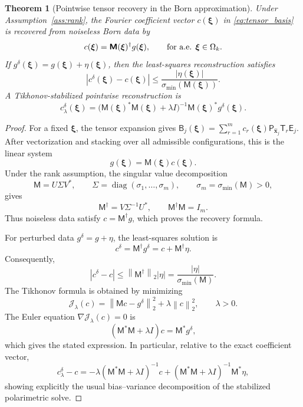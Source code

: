 \documentclass[11pt]{article}
\numberwithin{equation}{section}
\newcommand{\vect}[1]{\bm{#1}}
\newcommand{\tens}[1]{\bm{\mathsf{#1}}}
\newcommand{\Tt}{\ensuremath{\tens{T}}}
\newcommand{\Mt}{\ensuremath{\tens{M}}}
\newcommand{\Bt}{\ensuremath{\tens{B}}}
\newcommand{\abs}[1]{\left\lvert #1\right\rvert}
\newcommand{\norm}[1]{\left\lVert #1\right\rVert}
\theoremstyle{plain}
\newtheorem{theorem}{Theorem}[section]
\theoremstyle{definition}
\begin{document}
\begin{theorem}[Pointwise tensor recovery in the Born approximation]\label{thm:tensor_recovery}
Under Assumption~\ref{ass:rank}, the Fourier coefficient vector $c(\vect{\xi})$ in \eqref{eq:tensor_basis} is recovered from noiseless Born data by
\begin{equation*}
  c(\vect{\xi})=\Mt(\vect{\xi})^\dagger g(\vect{\xi}),
  \qquad \hbox{for a.e. } \vect \xi\in\Omega_k .
\end{equation*}
If $g^\delta(\vect \xi)=g(\vect{\xi})+\eta(\vect \xi)$, then the least-squares reconstruction satisfies
\begin{equation}\label{eq:pointwise_noise}
  \abs{c^\delta(\vect \xi)-c(\vect{\xi})}\le \frac{\abs{\eta(\vect \xi)}}{\sigma_{\min}(\Mt(\vect{\xi}))}.
\end{equation}
A Tikhonov-stabilized pointwise reconstruction is
\begin{equation}\label{eq:pointwise_tikhonov}
  c_\lambda^\delta(\vect \xi)=\big(\Mt(\vect{\xi})^*\Mt(\vect{\xi})+\lambda I\big)^{-1}\Mt(\vect{\xi})^*g^\delta(\vect \xi).
\end{equation}
\end{theorem}

\begin{proof}
For a fixed \(\vect{\xi}\), the tensor expansion gives $\Bt_j(\vect{\xi})
  =\sum_{r=1}^m c_r(\vect{\xi})\tens{P}_{\hat{\vect{x}}_j}\Tt_r\tens{E}_j$. After vectorization and stacking over all admissible configurations, this is the linear system
\[
  g(\vect{\xi})=\Mt(\vect{\xi})c(\vect{\xi}) .
\]
Under the rank assumption, the singular value decomposition
\[
  \Mt=U\Sigma V^*,
  \qquad
  \Sigma=\operatorname{diag}(\sigma_1,\ldots,\sigma_m),
  \qquad \sigma_m=\sigma_{\min}(\Mt)>0,
\]
gives
\[
  \Mt^\dagger=V\Sigma^{-1}U^*,
  \qquad
  \Mt^\dagger\Mt=I_m .
\]
Thus noiseless data satisfy \(c=\Mt^\dagger g\), which proves the recovery formula.

For perturbed data \(g^\delta=g+\eta\), the least-squares solution is
\[
  c^\delta=\Mt^\dagger g^\delta
  =c+\Mt^\dagger\eta .
\]
Consequently,
\[
  \abs{c^\delta-c}
  \le \norm{\Mt^\dagger}_2\abs{\eta}
  =\frac{\abs{\eta}}{\sigma_{\min}(\Mt)} .
\]
The Tikhonov formula is obtained by minimizing
\[
  \mathcal J_\lambda(c)=\norm{\Mt c-g^\delta}_2^2+\lambda\norm{c}_2^2,
  \qquad \lambda>0 .
\]
The Euler equation \(\nabla\mathcal J_\lambda(c)=0\) is
\[
  (\Mt^*\Mt+\lambda I)c=\Mt^*g^\delta,
\]
which gives the stated expression.  In particular, relative to the exact coefficient vector,
\[
  c_\lambda^\delta-c
  =-\lambda(\Mt^*\Mt+\lambda I)^{-1}c
  +(\Mt^*\Mt+\lambda I)^{-1}\Mt^*\eta,
\]
showing explicitly the usual bias--variance decomposition of the stabilized polarimetric solve.
\end{proof}
\end{document}
